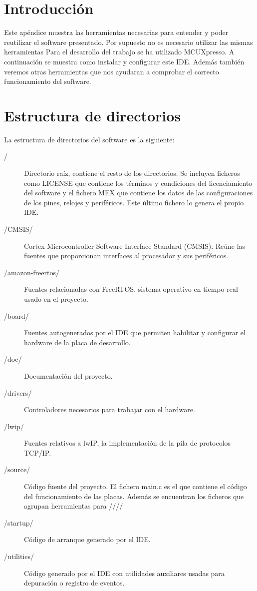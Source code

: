 
\section{Introducción}
Este apéndice muestra las herramientas necesarias para entender y poder reutilizar el software presentado. Por supuesto no es necesario utilizar las mismas herramientas
Para el desarrollo del trabajo se ha utilizado MCUXpresso. A continuación se muestra como instalar y configurar este IDE. Además también veremos otras herramientas que nos ayudaran a comprobar el correcto funcionamiento del software.

\section{Estructura de directorios}

La estructura de directorios del software es la siguiente:


\begin{description}
  \item[/] Directorio raíz, contiene el resto de los directorios. Se incluyen ficheros como LICENSE que contiene los términos y condiciones del licenciamiento del software y el fichero MEX que contiene los datos de las configuraciones de los pines, relojes y periféricos. Este último fichero lo genera el propio IDE.
  \item[/CMSIS/] Cortex Microcontroller Software Interface Standard (CMSIS). Reúne las fuentes que proporcionan interfaces al procesador y sus periféricos.
  \item[/amazon-freertos/] Fuentes relacionadas con FreeRTOS, sistema operativo en tiempo real usado en el proyecto.
  \item[/board/] Fuentes autogenerados por el IDE que permiten habilitar y configurar el hardware de la placa de desarrollo.
  \item[/doc/] Documentación del proyecto.
  \item[/drivers/] Controladores necesarios para trabajar con el hardware.
  \item[/lwip/] Fuentes relativos a lwIP, la implementación de la pila de protocolos TCP/IP.
  \item[/source/] Código fuente del proyecto. El fichero main.c es el que contiene el código del funcionamiento de las placas. Además se encuentran los ficheros que agrupan herramientas para ////
  \item[/startup/] Código de arranque generado por el IDE.
  \item[/utilities/] Código generado por el IDE con utilidades auxiliares usadas para depuración o registro de eventos.
\end{description}

